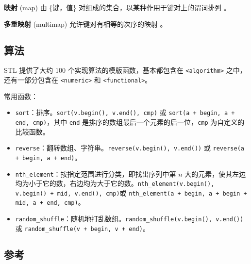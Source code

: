 \textbf{映射} (map) 由 \{键，值\} 对组成的集合，以某种作用于键对上的谓词排列 。

\textbf{多重映射} (multimap) 允许键对有相等的次序的映射 。

\subsection{算法}

STL 提供了大约 100 个实现算法的模版函数，基本都包含在 \texttt{<algorithm>} 之中，还有一部分包含在 \texttt{<numeric>} 和 \texttt{<functional>}。

常用函数：

\begin{itemize}
\item \texttt{sort}：排序。\texttt{sort(v.begin(), v.end(), cmp)} 或 \texttt{sort(a + begin, a + end, cmp)}，其中 \texttt{end} 是排序的数组最后一个元素的后一位，\texttt{cmp} 为自定义的比较函数。
\item \texttt{reverse}：翻转数组、字符串。\texttt{reverse(v.begin(), v.end())} 或 \texttt{reverse(a + begin, a + end)}。
\item \texttt{nth_element}：按指定范围进行分类，即找出序列中第 $n$ 大的元素，使其左边均为小于它的数，右边均为大于它的数。\texttt{nth_element(v.begin(), v.begin() + mid, v.end(), cmp)}或 \texttt{nth_element(a + begin, a + begin + mid, a + end, cmp)}。
\item \texttt{random_shuffle}：随机地打乱数组。\texttt{random_shuffle(v.begin(), v.end())} 或 \texttt{random_shuffle(v + begin, v + end)}。
\end{itemize}

\subsection{参考}

\href{https://en.cppreference.com/w/}{}

\href{http://www.cplusplus.com/reference/}{}
